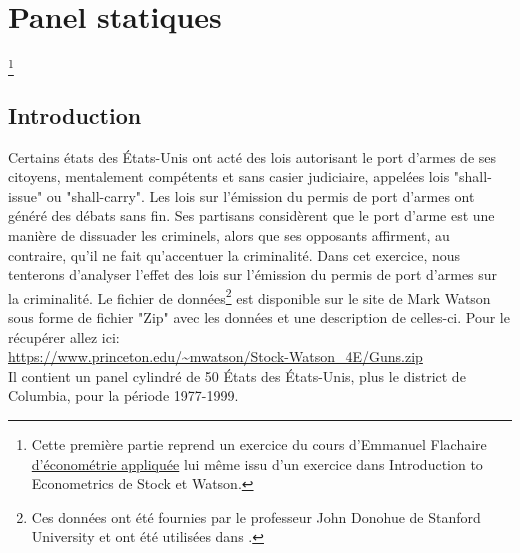 \newpage

\tableofcontents

\newpage


\section{Panel statiques}\footnote{Cette première partie reprend un exercice du cours d'Emmanuel Flachaire 
\href{https://sites.google.com/site/emmanuelflachaire/cours/econometrie-appliquee}{d'économétrie appliquée}
lui même issu d'un exercice dans Introduction to Econometrics de Stock et Watson.}

\subsection{Introduction}
Certains états des États-Unis ont acté des lois autorisant le port d'armes de ses citoyens,
mentalement compétents et sans casier judiciaire, appelées lois "shall-issue" ou "shall-carry".
Les lois sur l'émission du permis de port d'armes ont généré des débats sans fin. Ses partisans
considèrent que le port d'arme est une manière de dissuader les criminels, alors que ses
opposants affirment, au contraire, qu'il ne fait qu'accentuer la criminalité. Dans cet exercice,
nous tenterons d'analyser l'effet des lois sur l'émission du permis de port d'armes sur la
criminalité. Le fichier de données\footnote{Ces données ont été fournies par le professeur John Donohue de Stanford University et ont été utilisées dans 
\cite{AyresDonohueNBERw9336}.} est disponible sur le site de Mark Watson sous forme de fichier "Zip" avec les données et une description de celles-ci. Pour le récupérer allez ici: \\
\url{https://www.princeton.edu/~mwatson/Stock-Watson_4E/Guns.zip}\\
Il contient un panel cylindré de 50 États des États-Unis, plus le district de Columbia, pour la
période 1977-1999.

